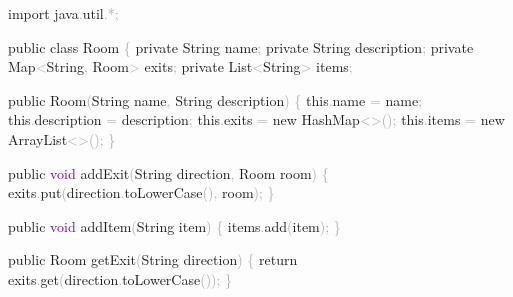 \documentclass[
  justified,
  openright,
]{tufte-book}
\newcommand{\BuiltInTok}[1]{#1}
\newcommand{\ControlFlowTok}[1]{\textcolor{BrandBlue}{#1}}
\newcommand{\DataTypeTok}[1]{\textcolor{Purple}{#1}}
\newcommand{\FunctionTok}[1]{\textcolor{BrandBlue}{#1}}
\newcommand{\ImportTok}[1]{\textcolor{BrandAccent}{#1}}
\newcommand{\KeywordTok}[1]{\textcolor{BrandBlue}{#1}}
\newcommand{\NormalTok}[1]{#1}
\newcommand{\OperatorTok}[1]{\textcolor{DarkGray}{#1}}
\newenvironment{Shaded}{%
  \begin{snugshade}
}{%
  \end{snugshade}
}
\begin{document}
\begin{Shaded}
\begin{Highlighting}[]
\KeywordTok{import} \ImportTok{java}\OperatorTok{.}\ImportTok{util}\OperatorTok{.*;}

\KeywordTok{public} \KeywordTok{class}\NormalTok{ Room }\OperatorTok{\{}
    \KeywordTok{private} \BuiltInTok{String}\NormalTok{ name}\OperatorTok{;}
    \KeywordTok{private} \BuiltInTok{String}\NormalTok{ description}\OperatorTok{;}
    \KeywordTok{private} \BuiltInTok{Map}\OperatorTok{\textless{}}\BuiltInTok{String}\OperatorTok{,}\NormalTok{ Room}\OperatorTok{\textgreater{}}\NormalTok{ exits}\OperatorTok{;}
    \KeywordTok{private} \BuiltInTok{List}\OperatorTok{\textless{}}\BuiltInTok{String}\OperatorTok{\textgreater{}}\NormalTok{ items}\OperatorTok{;}

    \KeywordTok{public} \FunctionTok{Room}\OperatorTok{(}\BuiltInTok{String}\NormalTok{ name}\OperatorTok{,} \BuiltInTok{String}\NormalTok{ description}\OperatorTok{)} \OperatorTok{\{}
        \KeywordTok{this}\OperatorTok{.}\FunctionTok{name} \OperatorTok{=}\NormalTok{ name}\OperatorTok{;}
        \KeywordTok{this}\OperatorTok{.}\FunctionTok{description} \OperatorTok{=}\NormalTok{ description}\OperatorTok{;}
        \KeywordTok{this}\OperatorTok{.}\FunctionTok{exits} \OperatorTok{=} \KeywordTok{new} \BuiltInTok{HashMap}\OperatorTok{\textless{}\textgreater{}();}
        \KeywordTok{this}\OperatorTok{.}\FunctionTok{items} \OperatorTok{=} \KeywordTok{new} \BuiltInTok{ArrayList}\OperatorTok{\textless{}\textgreater{}();}
    \OperatorTok{\}}

    \KeywordTok{public} \DataTypeTok{void} \FunctionTok{addExit}\OperatorTok{(}\BuiltInTok{String}\NormalTok{ direction}\OperatorTok{,}\NormalTok{ Room room}\OperatorTok{)} \OperatorTok{\{}
\NormalTok{        exits}\OperatorTok{.}\FunctionTok{put}\OperatorTok{(}\NormalTok{direction}\OperatorTok{.}\FunctionTok{toLowerCase}\OperatorTok{(),}\NormalTok{ room}\OperatorTok{);}
    \OperatorTok{\}}

    \KeywordTok{public} \DataTypeTok{void} \FunctionTok{addItem}\OperatorTok{(}\BuiltInTok{String}\NormalTok{ item}\OperatorTok{)} \OperatorTok{\{}
\NormalTok{        items}\OperatorTok{.}\FunctionTok{add}\OperatorTok{(}\NormalTok{item}\OperatorTok{);}
    \OperatorTok{\}}

    \KeywordTok{public}\NormalTok{ Room }\FunctionTok{getExit}\OperatorTok{(}\BuiltInTok{String}\NormalTok{ direction}\OperatorTok{)} \OperatorTok{\{}
        \ControlFlowTok{return}\NormalTok{ exits}\OperatorTok{.}\FunctionTok{get}\OperatorTok{(}\NormalTok{direction}\OperatorTok{.}\FunctionTok{toLowerCase}\OperatorTok{());}
    \OperatorTok{\}}


\end{Highlighting}
\end{Shaded}
\end{document}
